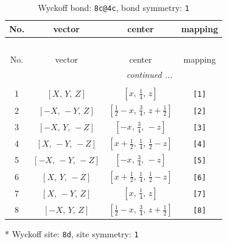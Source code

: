 \documentclass[fleqn,8pt]{jsarticle}
\begin{document}
\begin{longtable}{cccc}
\caption{Wyckoff bond: {\tt 8c@4c}, bond symmetry: {\tt 1}}
 \\
 \hline \hline
No. & vector & center & mapping \\ \hline \endfirsthead

\multicolumn{3}{l}{\tablename\ \thetable{}} \\
 \hline \hline
No. & vector & center & mapping \\ \hline \endhead

 \hline \hline
\multicolumn{3}{r}{\footnotesize\it continued ...} \\ \endfoot

 \hline \hline
\multicolumn{3}{r}{} \\ \endlastfoot

1 & $\left[ X,\, Y,\, Z \right]$ & $\left[ x,\, \frac{1}{4},\, z \right]$ & {\tt [1]} \\ \hline
2 & $\left[ - X,\, - Y,\, Z \right]$ & $\left[ \frac{1}{2} - x,\, \frac{3}{4},\, z + \frac{1}{2} \right]$ & {\tt [2]} \\ \hline
3 & $\left[ - X,\, Y,\, - Z \right]$ & $\left[ - x,\, \frac{3}{4},\, - z \right]$ & {\tt [3]} \\ \hline
4 & $\left[ X,\, - Y,\, - Z \right]$ & $\left[ x + \frac{1}{2},\, \frac{1}{4},\, \frac{1}{2} - z \right]$ & {\tt [4]} \\ \hline
5 & $\left[ - X,\, - Y,\, - Z \right]$ & $\left[ - x,\, \frac{3}{4},\, - z \right]$ & {\tt [5]} \\ \hline
6 & $\left[ X,\, Y,\, - Z \right]$ & $\left[ x + \frac{1}{2},\, \frac{1}{4},\, \frac{1}{2} - z \right]$ & {\tt [6]} \\ \hline
7 & $\left[ X,\, - Y,\, Z \right]$ & $\left[ x,\, \frac{1}{4},\, z \right]$ & {\tt [7]} \\ \hline
8 & $\left[ - X,\, Y,\, Z \right]$ & $\left[ \frac{1}{2} - x,\, \frac{3}{4},\, z + \frac{1}{2} \right]$ & {\tt [8]} \\
\end{longtable}
* Wyckoff site: {\tt 8d}, site symmetry: {\tt 1}
\renewcommand{\arraystretch}{1.2}
\end{document}
